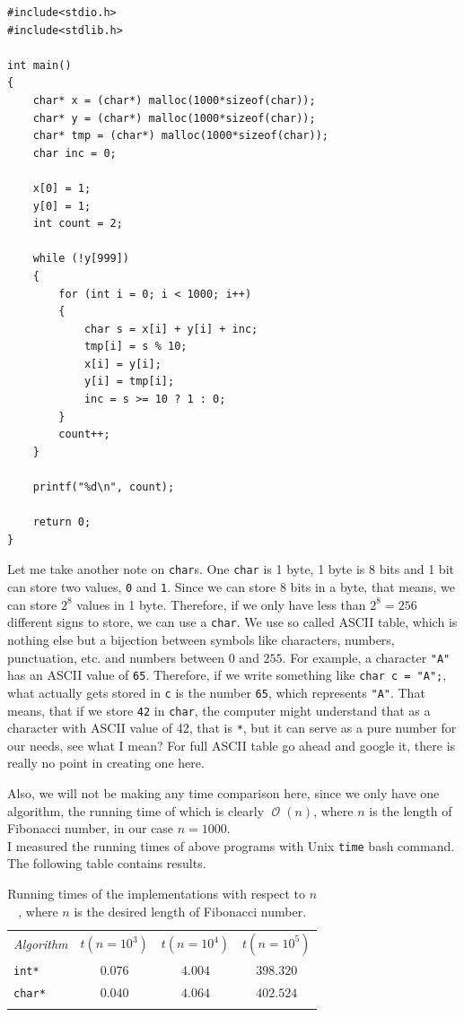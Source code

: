 \documentclass{book}
\DeclareMathOperator{\bigo}{\mathcal{O}}
\begin{document}
\begin{verbatim}
#include<stdio.h>
#include<stdlib.h>

int main()
{
    char* x = (char*) malloc(1000*sizeof(char));
    char* y = (char*) malloc(1000*sizeof(char));
    char* tmp = (char*) malloc(1000*sizeof(char));
    char inc = 0;

    x[0] = 1;
    y[0] = 1;
    int count = 2;

    while (!y[999])
    {
        for (int i = 0; i < 1000; i++)
        {
            char s = x[i] + y[i] + inc;
            tmp[i] = s % 10;
            x[i] = y[i];
            y[i] = tmp[i];
            inc = s >= 10 ? 1 : 0;
        }
        count++;
    }

    printf("%d\n", count);

    return 0;
}
\end{verbatim}

Let me take another note on \texttt{char}s. One \texttt{char} is 1 byte, 1 byte is 8 bits and 1 bit can store two values, \texttt{0} and \texttt{1}. Since we can store 8 bits in a byte, that means, we can store $2^8$ values in 1 byte. Therefore, if we only have less than $2^8 = 256$ different signs to store, we can use a \texttt{char}. We use so called ASCII table, which is nothing else but a bijection between symbols like characters, numbers, punctuation, etc. and numbers between $0$ and $255$. For example, a character \texttt{"A"} has an ASCII value of \texttt{65}. Therefore, if we write something like \texttt{char c = "A";}, what actually gets stored in \texttt{c} is the number \texttt{65}, which represents \texttt{"A"}. That means, that if we store \texttt{42} in \texttt{char}, the computer might understand that as a character with ASCII value of 42, that is \texttt{*}, but it can serve as a pure number for our needs, see what I mean? For full ASCII table go ahead and google it, there is really no point in creating one here.

Also, we will not be making any time comparison here, since we only have one algorithm, the running time of which is clearly $\bigo(n)$, where $n$ is the length of Fibonacci number, in our case $n = 1000$.\\

I measured the running times of above programs with Unix \texttt{time} bash command. The following table contains results.

\begin{table}[h!]
\centering
\begin{tabular}{||l||c|c|c||}
\hhline{|t:====:t|}
\textit{Algorithm} & $t(n=10^3)$ & $t(n=10^4)$ & $t(n=10^5)$\\ \hhline{||=||=|=|=||}
\texttt{int*} & $0.076$ & $4.004$ & $398.320$ \\ \hhline{||-||-|-|-||}
\texttt{char*} & $0.040$ & $4.064$ & $402.524$ \\ \hhline{|b:====:b|}
\end{tabular}
\caption{Running times of the implementations with respect to $n$, where $n$ is the desired length of Fibonacci number.} 
\end{table}
\end{document}
